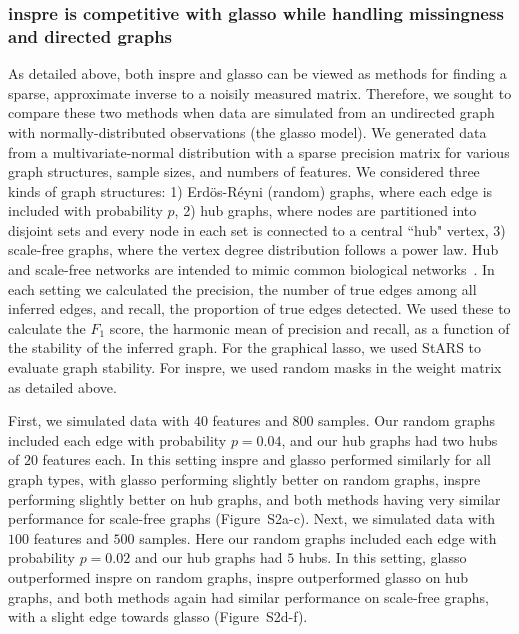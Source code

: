 \documentclass{article}
\begin{document}
\subsubsection*{inspre is competitive with glasso while handling missingness and directed graphs}
As detailed above, both inspre and glasso can be viewed as methods
for finding a sparse, approximate inverse to a noisily measured matrix.
Therefore, we sought to compare these two methods when data are simulated
from an undirected graph with normally-distributed observations (the glasso model). We generated data
from a multivariate-normal distribution with a sparse precision matrix
for various graph structures, sample sizes, and numbers of features.
We considered three kinds of graph structures: 1) Erd\"os-R\'eyni (random) graphs,
where each edge is included with probability $p$, 2) hub graphs, where nodes
are partitioned into
disjoint sets and every node in each set is connected to a central ``hub" vertex,
3) scale-free graphs, where the vertex degree distribution
follows a power law. Hub and scale-free networks are intended to mimic common
biological networks~\cite{Barabasi1999}. In each setting we calculated the precision,
the number of true edges among all inferred edges, and recall, the proportion
of true edges detected. We used these to calculate the $F_1$ score, the
harmonic mean of precision and recall, as a function of the
stability of the inferred graph. For the graphical lasso, we used StARS to
evaluate graph stability. For inspre, we used random masks in the weight matrix
as detailed above.

First, we simulated data with $40$ features and $800$ samples. Our random
graphs included each edge with probability $p=0.04$, and our hub graphs had
two hubs of $20$ features each. In this setting inspre and glasso performed
similarly for all graph types, with glasso performing slightly better on
random graphs, inspre performing slightly better on hub graphs, and 
both methods having very similar performance for scale-free graphs
(Figure~S2a-c). Next, we simulated  data with $100$
features and $500$ samples. Here our random graphs included each edge with
probability $p=0.02$ and our hub graphs had $5$ hubs. In this setting, glasso outperformed inspre on
random graphs, inspre outperformed glasso on hub graphs, and both methods again
had similar performance on scale-free graphs, with a slight edge towards
glasso (Figure~S2d-f).
\end{document}
